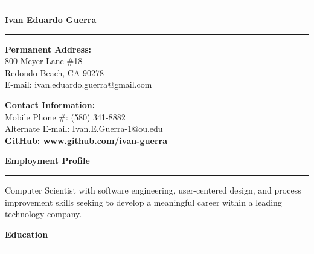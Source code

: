 \documentclass[10pt,letterpaper]{article}
\begin{document}
	
\hrule
\begin{center}
  \begin{LARGE}
    \textbf{Ivan Eduardo Guerra}
  \end{LARGE}
\end{center}
\hrule
	
\medskip
	
\begin{minipage}[t]{0.53\textwidth}
  \begin{flushleft}
    \textbf{Permanent Address:}\\
    800 Meyer Lane \#18\\
    Redondo Beach, CA 90278\\
    E-mail: ivan.eduardo.guerra@gmail.com
  \end{flushleft}
\end{minipage}
\begin{minipage}[t]{0.44\textwidth}
  \begin{flushright}
    \begin{flushleft}
      \textbf{Contact Information:}\\
      Mobile Phone \#: (580) 341-8882\\
      Alternate E-mail: Ivan.E.Guerra-1@ou.edu\\
      \underline{\textbf{GitHub: www.github.com/ivan-guerra}}
    \end{flushleft}
  \end{flushright}
\end{minipage}
	
\smallskip
	
	\begin{large}
          \textbf{Employment Profile}
	\end{large}
	
	\smallskip \hrule
	
	\begin{flushleft}
          Computer Scientist with software engineering, user-centered
          design, and process improvement skills seeking to develop a
          meaningful career within a leading technology company.
	\end{flushleft}
	
	\smallskip
	
	\begin{large}
          \textbf{Education}
	\end{large}
	
	\smallskip \hrule \smallskip
	
\end{document}
